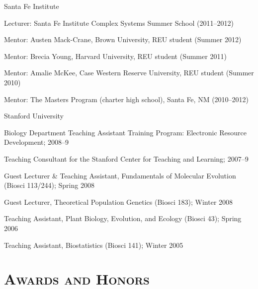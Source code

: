 \documentclass[centered,overlapped,line]{res}
\begin{document}
\begin{resume}
  \begin{compactitem}[]
  \item Santa Fe Institute
    \begin{compactitem}[--]
    \item Lecturer: Santa Fe Institute Complex Systems Summer School (2011--2012)
    \item Mentor: Austen Mack-Crane, Brown University, REU student (Summer 2012)
    \item Mentor: Brecia Young, Harvard University, REU student (Summer 2011)
    \item Mentor: Amalie McKee, Case Western Reserve University, REU student (Summer 2010)
    \item Mentor: The Masters Program  (charter high school), Santa Fe, NM (2010--2012)
    \end{compactitem}
    \vspace{0.5ex}
  \item Stanford University
    \begin{compactitem}[--]
    \item Biology Department Teaching Assistant Training Program: Electronic Resource Development; 2008--9
    \item Teaching Consultant for the Stanford Center for Teaching and Learning; 2007--9
    \item Guest Lecturer \& Teaching Assistant, Fundamentals of Molecular Evolution (Biosci 113/244); Spring 2008
    \item Guest Lecturer, Theoretical Population Genetics (Biosci 183); Winter 2008
    \item Teaching Assistant, Plant Biology, Evolution, and Ecology (Biosci 43); Spring 2006
    \item Teaching Assistant, Biostatistics (Biosci 141); Winter 2005
    \end{compactitem}
  \end{compactitem}




  \section{\bf \large \scshape  Awards and Honors}


\end{resume}
\end{document}
